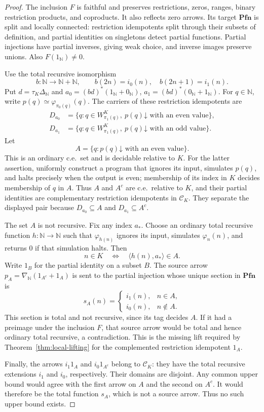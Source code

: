 \documentclass[11pt]{article}
\newcommand{\N}{\mathbb N}
\newcommand{\Pfn}{\mathbf{Pfn}}
\begin{document}
\begin{proof}
The inclusion $F$ is faithful and preserves restrictions, zeros,
ranges, binary restriction products, and coproducts. It also reflects
zero arrows. Its target $\Pfn$ is split and locally connected:
restriction idempotents split through their subsets of definition,
and partial identities on singletons detect partial functions.
Partial injections have partial inverses, giving weak choice, and
inverse images preserve unions. Also $F(1_{\N})\ne0$.

Use the total recursive isomorphism
\[
 b:\N\longrightarrow\N+\N,\qquad
 b(2n)=i_0(n),\quad b(2n+1)=i_1(n).
\]
Put $d=\tau_K\Delta_{\N}$ and
$a_0=(bd)^*(1_{\N}+0_{\N})$,
$a_1=(bd)^*(0_{\N}+1_{\N})$.
For $q\in\N$, write
$p(q)\simeq\varphi_{\pi_0(q)}(q)$. The carriers of these restriction idempotents are
\[
 \begin{aligned}
 D_{a_0}&=\{q:q\in W_{\pi_1(q)}^K,
                    \ p(q)\mathord\downarrow\text{ with an even value}\},\\
 D_{a_1}&=\{q:q\in W_{\pi_1(q)}^K,
                    \ p(q)\mathord\downarrow\text{ with an odd value}\}.
 \end{aligned}
\]
Let
\[
 A=\{q:p(q)\mathord\downarrow\text{ with an even value}\}.
\]
This is an ordinary c.e.\ set and is decidable relative to $K$.
For the latter assertion, uniformly construct a program that ignores
its input, simulates $p(q)$, and halts precisely when the output is
even; membership of its index in $K$ decides membership of $q$ in $A$.
Thus $A$ and $A^c$ are c.e.\ relative to $K$, and their partial
identities are complementary restriction idempotents in $\mathcal C_K$.
They separate the displayed pair because
$D_{a_0}\subseteq A$ and $D_{a_1}\subseteq A^c$.

The set $A$ is not recursive. Fix any index $a_*$. Choose an ordinary
total recursive function $h:\N\to\N$ such that $\varphi_{h(n)}$
ignores its input, simulates $\varphi_n(n)$, and returns $0$ if that
simulation halts. Then
\[
 n\in K\quad\Longleftrightarrow\quad
 \langle h(n),a_*\rangle\in A.
\]
Write $1_B$ for the partial identity on a subset $B$. The source
arrow $p_A=\nabla_{\N}(1_{A^c}+1_A)$ is sent to the partial
injection whose unique section in $\Pfn$ is
\[
 s_A(n)=
 \begin{cases}
  i_1(n),&n\in A,\\
  i_0(n),&n\notin A.
 \end{cases}
\]
This section is total and not recursive, since its tag decides $A$.
If it had a preimage under the inclusion $F$, that source arrow would
be total and hence ordinary total recursive, a contradiction.
This is the missing lift required by
Theorem~\ref{thm:local-lifting} for the complemented restriction idempotent $1_A$.

Finally, the arrows $i_1 1_A$ and $i_0 1_{A^c}$ belong to
$\mathcal C_K$: they have the total recursive extensions $i_1$
and $i_0$, respectively. Their domains are disjoint. Any common
upper bound would agree with the first arrow on $A$ and the second
on $A^c$. It would therefore be the total function $s_A$, which
is not a source arrow. Thus no such upper bound exists.
\end{proof}
\end{document}

